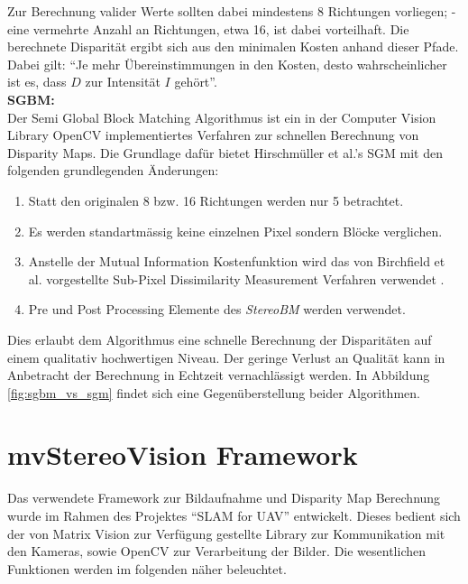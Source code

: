 \noindent
Zur Berechnung valider Werte sollten dabei mindestens 8 Richtungen vorliegen; -  eine vermehrte Anzahl an Richtungen, etwa 16, ist dabei vorteilhaft. Die berechnete Disparität ergibt sich aus den minimalen Kosten anhand dieser Pfade. Dabei gilt: “Je mehr Übereinstimmungen in den Kosten, desto wahrscheinlicher ist es, dass $D$ zur Intensität $I$ gehört”.\\

\noindent
\textbf{SGBM:} \\
Der Semi Global Block Matching Algorithmus ist ein in der Computer Vision Library OpenCV implementiertes Verfahren zur schnellen Berechnung von Disparity Maps. Die Grundlage dafür bietet Hirschmüller et al.’s SGM \cite{hirschmueller2008sgm} mit den folgenden grundlegenden Änderungen:

\begin{enumerate}[label=C.\arabic*]
	\item Statt den originalen 8 bzw. 16 Richtungen werden nur 5 betrachtet. \label{item:differences_directions}
	\item Es werden  standartm\"assig keine einzelnen Pixel sondern Blöcke verglichen. \label{item:differences_matching}
	\item Anstelle der Mutual Information Kostenfunktion wird das von Birchfield et al. vorgestellte Sub-Pixel Dissimilarity Measurement Verfahren verwendet \cite{birchfield-tomasi}.
	\item Pre und Post Processing Elemente des \emph{StereoBM} \cite{opencv_doc} werden verwendet.
\end{enumerate}

\noindent
Dies erlaubt dem Algorithmus eine schnelle Berechnung der Disparitäten auf einem qualitativ hochwertigen Niveau. Der geringe Verlust an Qualität kann in Anbetracht der Berechnung in Echtzeit vernachlässigt werden. In Abbildung \ref{fig:sgbm_vs_sgm} findet sich eine Gegenüberstellung beider Algorithmen.


\section{mvStereoVision Framework}
\label{sec:framework}
Das verwendete Framework zur Bildaufnahme und Disparity Map Berechnung wurde im Rahmen des Projektes “SLAM for UAV” entwickelt. Dieses bedient sich der von Matrix Vision zur Verfügung gestellte Library \cite{matrixvision} zur Kommunikation mit den Kameras, sowie OpenCV \cite{opencv} zur Verarbeitung der Bilder. Die wesentlichen Funktionen werden im folgenden näher beleuchtet.



